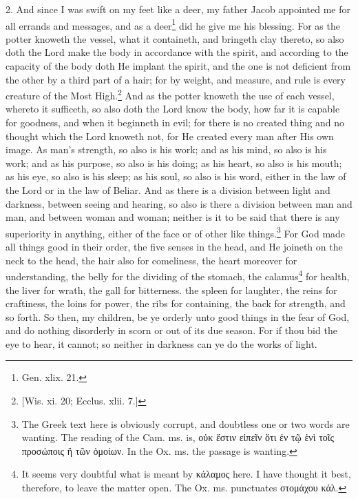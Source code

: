 2. And since I was swift on my feet like a deer, my father Jacob appointed me for all errands and messages, and as a deer\footnote{Gen. xlix. 21.} did he give me his blessing. For as the potter knoweth the vessel, what it containeth, and bringeth clay thereto, so also doth the Lord make the body in accordance with the spirit, and according to the capacity of the body doth He implant the spirit, and the one is not deficient from the other by a third part of a hair; for by weight, and measure, and rule is every creature of the Most High.\footnote{[Wis. xi. 20; Ecclus. xlii. 7.]} And as the potter knoweth the use of each vessel, whereto it sufficeth, so also doth the Lord know the body, how far it is capable for goodness, and when it beginneth in evil; for there is no created thing and no thought which the Lord knoweth not, for He created every man after His own image. As man’s strength, so also is his work; and as his mind, so also is his work; and as his purpose, so also is his doing; as his heart, so also is his mouth; as his eye, so also is his sleep; as his soul, so also is his word, either in the law of the Lord or in the law of Beliar. And as there is a division between light and darkness, between seeing and hearing, so also is there a division between man and man, and between woman and woman; neither is it to be said that there is any superiority in anything, either of the face or of other like things.\footnote{The Greek text here is obviously corrupt, and doubtless one or two words are wanting. The reading of the Cam. ms. is, \textgreek{οὐκ ἔστιν εἰπεῖν ὅτι ἐν τῷ ἑνὶ τοῖς προσώποις ἢ τῶν ὁμοίων}. In the Ox. ms. the passage is wanting.} For God made all things good in their order, the five senses in the head, and He joineth on the neck to the head, the hair also for comeliness, the heart moreover for understanding, the belly for the dividing of the stomach, the calamus\footnote{It seems very doubtful what is meant by \textgreek{κάλαμος} here. I have thought it best, therefore, to leave the matter open. The Ox. ms. punctuates \textgreek{στομάχου κάλ}.} for health, the liver for wrath, the gall for bitterness. the spleen for laughter, the reins for craftiness, the loins for power, the ribs for containing, the back for strength, and so forth. So then, my children, be ye orderly unto good things in the fear of God, and do nothing disorderly in scorn or out of its due season. For if thou bid the eye to hear, it cannot; so neither in darkness can ye do the works of light.

